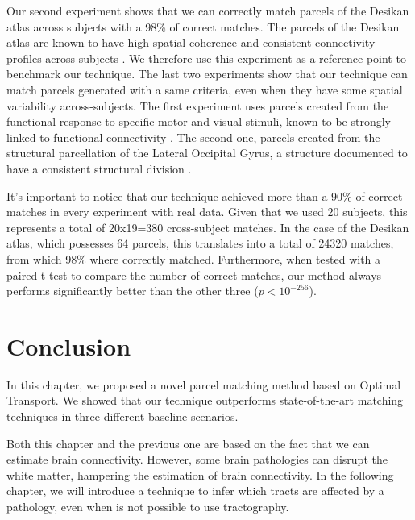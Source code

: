Our second experiment shows that we can correctly match parcels of the Desikan
atlas across subjects with a 98\% of correct matches. The parcels of the Desikan
atlas are known to have high spatial coherence and consistent connectivity
profiles across subjects \cite{DeReus2013}. We therefore use this experiment
as a reference point to benchmark our technique.
The last two experiments show that our technique can match parcels generated
with a same criteria, even when they have some spatial variability across-subjects.
The first experiment uses parcels created from the functional response to specific
motor and visual stimuli, known to be strongly linked to functional
connectivity \cite{Osher2016, Penfield1954}. The second one, parcels created
from the structural parcellation of the Lateral Occipital Gyrus, a structure
documented to have a consistent structural division \cite{ThiebautdeSchotten2016, Gallardo2017a}. 

It's important to notice that our technique achieved more than a 90\% of correct
matches in every experiment with real data. Given that we used 20 subjects, this
represents a total of 20x19=380 cross-subject matches. In the case of the Desikan
atlas, which possesses 64 parcels, this translates into a total of 24320 matches,
from which 98\% where correctly matched. Furthermore, when tested with a paired
t-test to compare the number of correct matches, our method always performs
significantly better than the other three ($p<10^{-256}$).


\section{Conclusion}
In this chapter, we proposed a novel parcel matching method based on Optimal
Transport. We showed that our technique outperforms state-of-the-art matching
techniques in three different baseline scenarios.

Both this chapter and the previous one are based on the fact that we can
estimate brain connectivity. However, some brain pathologies can disrupt
the white matter, hampering the estimation of brain connectivity. In
the following chapter, we will introduce a technique to infer which
tracts are affected by a pathology, even when is not possible to use
tractography.



\chapterbib
